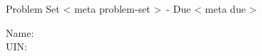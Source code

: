 \begin{center}
\Large{Problem Set {{< meta problem-set >}}~- Due {{< meta due >}} }
\end{center}
Name:\\
UIN:
